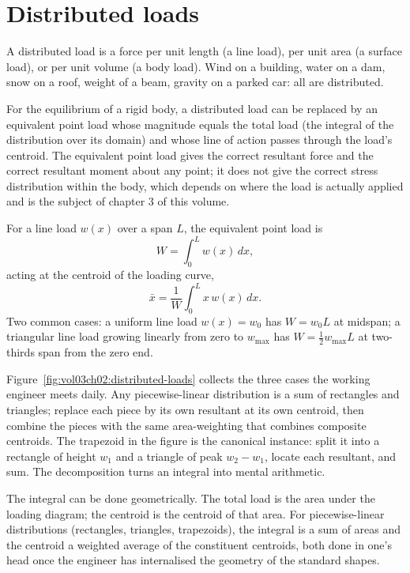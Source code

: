 \section{Distributed loads}

A distributed load is a force per unit length (a line load), per
unit area (a surface load), or per unit volume (a body load). Wind
on a building, water on a dam, snow on a roof, weight of a beam,
gravity on a parked car: all are distributed.

For the equilibrium of a rigid body, a distributed load can be
replaced by an equivalent point load whose magnitude equals the
total load (the integral of the distribution over its domain) and
whose line of action passes through the load's centroid. The
equivalent point load gives the correct resultant force and the
correct resultant moment about any point; it does not give the
correct stress distribution within the body, which depends on
where the load is actually applied and is the subject of chapter 3
of this volume.

For a line load $w(x)$ over a span $L$, the equivalent point load
is
\[
W = \int_0^L w(x) \,dx,
\]
acting at the centroid of the loading curve,
\[
\bar{x} = \frac{1}{W} \int_0^L x \, w(x) \,dx.
\]
Two common cases: a uniform line load $w(x) = w_0$ has $W = w_0 L$
at midspan; a triangular line load growing linearly from zero to
$w_{\max}$ has $W = \tfrac{1}{2} w_{\max} L$ at two-thirds span
from the zero end.



Figure~\ref{fig:vol03ch02:distributed-loads} collects the three cases
the working engineer meets daily. Any piecewise-linear distribution is
a sum of rectangles and triangles; replace each piece by its own
resultant at its own centroid, then combine the pieces with the same
area-weighting that combines composite centroids. The trapezoid in the
figure is the canonical instance: split it into a rectangle of height
$w_1$ and a triangle of peak $w_2 - w_1$, locate each resultant, and
sum. The decomposition turns an integral into mental arithmetic.

The integral can be done geometrically. The total load is the
area under the loading diagram; the centroid is the centroid of
that area. For piecewise-linear distributions (rectangles,
triangles, trapezoids), the integral is a sum of areas and the
centroid a weighted average of the constituent centroids, both
done in one's head once the engineer has internalised the
geometry of the standard shapes.

